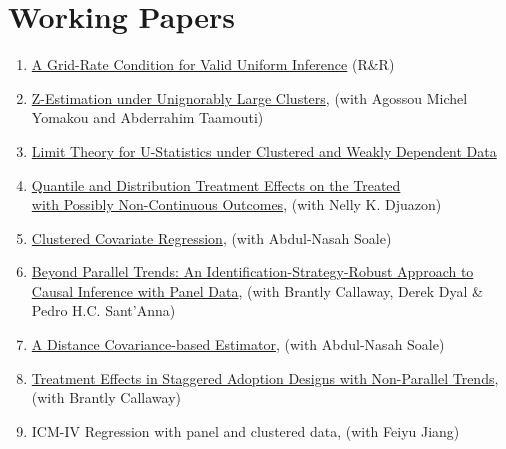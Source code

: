 \documentclass[12pt,letterpaper]{article}
\begin{document}
\section*{Working Papers}
\begin{enumerate}
    \item \href{https://arxiv.org/pdf/2605.12284}{A Grid-Rate Condition for Valid Uniform Inference} (R\&R)

    \item \href{https://arxiv.org/abs/2611.10925}{Z-Estimation under Unignorably Large Clusters}, (with Agossou Michel Yomakou and Abderrahim Taamouti)

    \item \href{https://arxiv.org/pdf/2608.18443}{Limit Theory for U-Statistics under Clustered and Weakly Dependent Data}

    \item \href{https://arxiv.org/pdf/2408.07842}{Quantile and Distribution Treatment Effects on the Treated\\ with Possibly Non-Continuous Outcomes}, (with Nelly K. Djuazon)
    
    \item \href{https://arxiv.org/pdf/2302.09255.pdf}{Clustered Covariate Regression}, (with Abdul-Nasah Soale)
  
    \item \href{https://arxiv.org/pdf/2511.21977}{Beyond Parallel Trends: An Identification-Strategy-Robust
Approach to Causal Inference with Panel Data}, (with Brantly Callaway, Derek Dyal \& Pedro H.C. Sant’Anna)
    
    \item \href{https://arxiv.org/pdf/2102.07008.pdf}{A Distance Covariance-based Estimator}, (with Abdul-Nasah Soale)
    
    \item \href{https://arxiv.org/pdf/2308.02899.pdf}{Treatment Effects in Staggered Adoption Designs with Non-Parallel Trends}, (with Brantly Callaway)
	
	  \item ICM-IV Regression with panel and clustered data, (with Feiyu Jiang) %

	
	
\end{enumerate}
\end{document}
